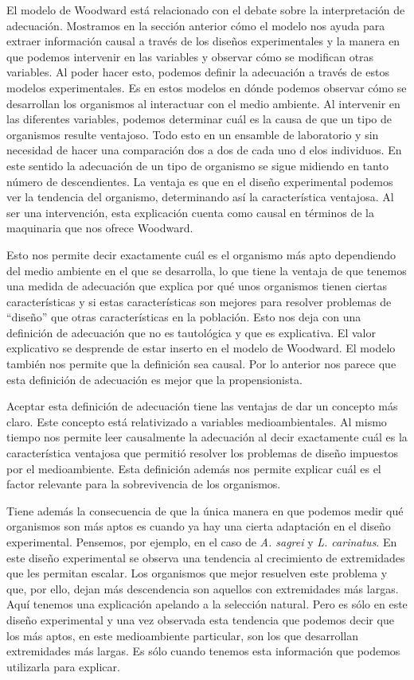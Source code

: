  El modelo de Woodward está relacionado con el debate sobre la interpretación de adecuación. Mostramos en la sección anterior cómo el modelo nos ayuda para extraer información causal a través de los diseños experimentales y la manera en que podemos intervenir en las variables y observar cómo se modifican otras variables. Al poder hacer esto, podemos definir la adecuación a través de estos modelos experimentales. Es en estos modelos en dónde podemos observar cómo se desarrollan los organismos al interactuar con el medio ambiente. Al intervenir en las diferentes variables, podemos determinar cuál es la causa de que un tipo de organismos resulte ventajoso. Todo esto en un ensamble de laboratorio y sin necesidad de hacer una comparación dos a dos de cada uno d elos individuos. En este sentido la adecuación de un tipo de organismo se sigue midiendo en tanto número de descendientes. La ventaja es que en el diseño experimental podemos ver la tendencia del organismo, determinando así la característica ventajosa. Al ser una intervención, esta explicación cuenta como causal en términos de la maquinaria que nos ofrece Woodward.

 Esto nos permite decir exactamente cuál es el organismo más apto dependiendo del medio ambiente en el que se desarrolla, lo que tiene la ventaja de que tenemos una medida de adecuación que explica por qué unos organismos tienen ciertas características y si estas características son mejores para resolver problemas de ``diseño'' que otras características en la población. Esto nos deja con una definición de adecuación que no  es tautológica y que es  explicativa. El valor explicativo se desprende de estar inserto en el modelo de Woodward. El modelo también nos permite que la definición sea causal. Por lo anterior nos parece que esta definición de adecuación es mejor que la propensionista.

 Aceptar esta definición de adecuación tiene las ventajas de dar un concepto más claro. Este concepto está relativizado a variables medioambientales. Al mismo tiempo nos permite leer causalmente la adecuación al decir exactamente cuál es la característica ventajosa que permitió resolver los problemas de diseño impuestos por el medioambiente. Esta definición además nos permite explicar cuál es el factor relevante para la sobrevivencia de los organismos.

 Tiene además la consecuencia de que la única manera en que podemos medir qué organismos son más aptos es cuando ya hay una cierta adaptación en el diseño experimental. Pensemos, por ejemplo, en el caso de \emph{A. sagrei} y \emph{L. carinatus}. En este diseño experimental se observa una tendencia al crecimiento de extremidades que les permitan escalar. Los organismos que mejor resuelven este problema y que, por ello, dejan más descendencia son aquellos con extremidades más largas. Aquí tenemos una explicación apelando a la selección natural. Pero es sólo en este diseño experimental y una vez observada esta tendencia que podemos decir que los más aptos, en este medioambiente particular, son los que desarrollan extremidades más largas. Es sólo cuando tenemos esta información que podemos utilizarla para explicar.


